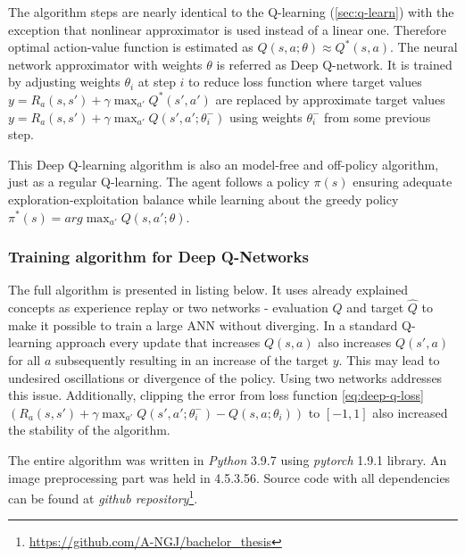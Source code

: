 The algorithm steps are nearly identical to the Q-learning (\ref{sec:q-learn}) with the exception that nonlinear approximator is used instead of a
linear one. Therefore optimal action-value function is estimated as $Q(s, a; \theta) \approx Q^*(s, a)$. The neural network approximator with
weights $\theta$ is referred as Deep Q-network. It is trained by adjusting weights $\theta_i$ at step $i$ to reduce loss function where target
values $y = R_a(s, s') + \gamma \max_{a'}Q^*(s', a')$ are replaced by approximate target values $y = R_a(s, s') + \gamma \max_{a'}Q(s',
a';\theta^-_i)$ using weights $\theta^-_i$ from some previous step.

This Deep Q-learning algorithm is also an model-free and off-policy algorithm, just as a regular Q-learning. The agent follows a policy $\pi(s)$
ensuring adequate exploration-exploitation balance while learning about the greedy policy $\pi^*(s) = arg\max_{a'}Q(s, a'; \theta)$.

\subsubsection*{Training algorithm for Deep Q-Networks}
\label{sub2:training-algo-for-deep-q-net}

The full algorithm is presented in listing below. It uses already explained concepts as experience replay or two networks - evaluation $Q$ and
target $\hat{Q}$ to make it possible to train a large ANN without diverging. In a standard Q-learning approach every update that increases $Q(s,
a)$ also increases $Q(s', a)$ for all $a$ subsequently resulting in an increase of the target $y$. This may lead to undesired oscillations or
divergence of the policy. Using two networks addresses this issue. Additionally, clipping the error from loss function \ref{eq:deep-q-loss}
$\left(R_a(s, s') + \gamma \max_{a'} Q(s', a'; \theta^-_i) - Q(s, a; \theta_i) \right)$ to $[-1, 1]$ also increased the stability of the algorithm.

The entire algorithm was written in \emph{Python} 3.9.7 using \emph{pytorch} 1.9.1 library. An image preprocessing part was held in
 4.5.3.56. Source code with all dependencies can be found at \emph{github
repository}\footnote{\url{https://github.com/A-NGJ/bachelor_thesis}}.

